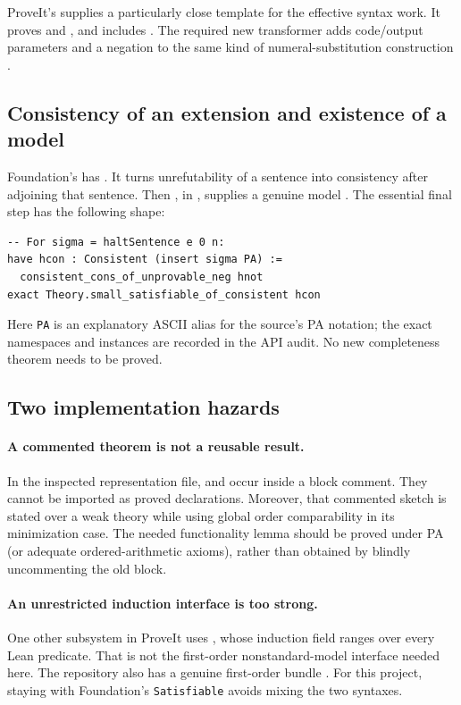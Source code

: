 \documentclass[11pt]{article}
\theoremstyle{definition}
\theoremstyle{remark}
\begin{document}
ProveIt's  supplies a particularly close template
for the effective syntax work. It proves
 and
, and includes
. The required new
transformer adds code/output parameters and a negation to the same kind
of numeral-substitution construction \cite{PAUndecidable}.

\subsection{Consistency of an extension and existence of a model}

Foundation's  has
. It turns
unrefutability of a sentence into consistency after adjoining that
sentence. Then
, in
, supplies a
genuine model \cite{FoundationCompleteness}. The essential final step has
the following shape:
\begin{lstlisting}
-- For sigma = haltSentence e 0 n:
have hcon : Consistent (insert sigma PA) :=
  consistent_cons_of_unprovable_neg hnot
exact Theory.small_satisfiable_of_consistent hcon
\end{lstlisting}
Here \texttt{PA} is an explanatory ASCII alias for the source's PA
notation; the exact namespaces and instances are recorded in the API
audit. No new completeness theorem needs to be proved.

\subsection{Two implementation hazards}

\paragraph{A commented theorem is not a reusable result.}
In the inspected representation file,  and
 occur inside a block comment. They cannot be imported as
proved declarations. Moreover, that commented sketch is stated over a
weak theory while using global order comparability in its minimization
case. The needed functionality lemma should be proved under PA (or
adequate ordered-arithmetic axioms), rather than obtained by blindly
uncommenting the old block.

\paragraph{An unrestricted induction interface is too strong.}
One other subsystem in ProveIt uses , whose
induction field ranges over every Lean predicate. That is not the
first-order nonstandard-model interface needed here. The repository also
has a genuine first-order bundle
\cite{TwoModels}. For this project, staying with Foundation's
\texttt{Satisfiable} avoids mixing the two syntaxes.
\end{document}
